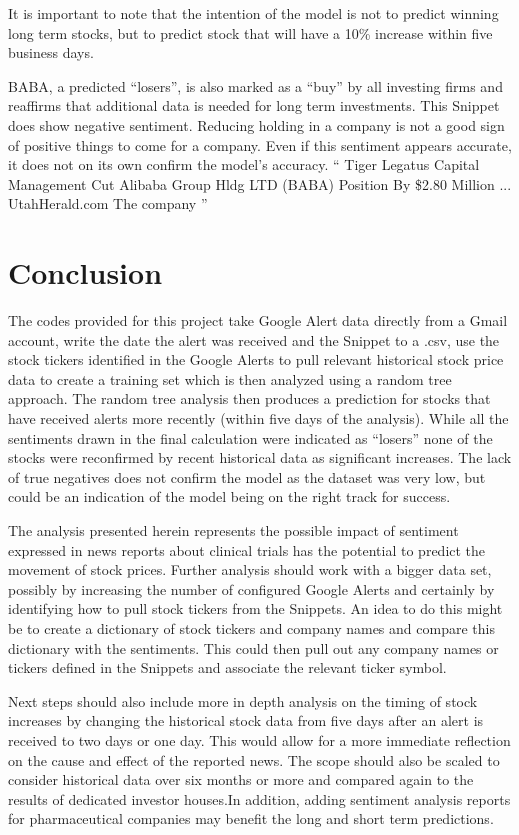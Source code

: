 \documentclass[sigconf]{acmart}
\begin{document}
 It is important to note that the intention of the model is not to predict winning long term stocks, but to predict stock that will have a 10\% increase within five business days.

BABA, a predicted ``losers'', is also marked as a ``buy'' by all investing firms and reaffirms that additional data is needed for long term investments. This Snippet does show negative sentiment. Reducing holding in a company is not a good sign of positive things to come for a company. Even if this sentiment appears accurate, it does not on its own confirm the model's accuracy.
``
Tiger Legatus Capital Management Cut Alibaba Group Hldg LTD (BABA) Position By \$2.80 Million ... UtahHerald.com The company
''



\section{Conclusion}
The codes provided for this project take Google Alert data directly from a Gmail account, write the date the alert was received and the Snippet to a .csv, use the stock tickers identified in the Google Alerts to pull relevant historical stock price data to create a training set which is then analyzed using a random tree approach. The random tree analysis then produces a prediction for stocks that have received alerts more recently (within five days of the analysis). While all the sentiments drawn in the final calculation were indicated as ``losers'' none of the stocks were reconfirmed by recent historical data as significant increases. The lack of true negatives does not confirm the model as the dataset was very low, but could be an indication of the model being on the right track for success.

The analysis presented herein represents the possible impact of sentiment expressed in news reports about clinical trials has the potential to predict the movement of stock prices. Further analysis should work with a bigger data set, possibly by increasing the number of configured Google Alerts and certainly by identifying how to pull stock tickers from the Snippets. An idea to do this might be to create a dictionary of stock tickers and company names and compare this dictionary with the sentiments. This could then pull out any company names or tickers defined in the Snippets and associate the relevant ticker symbol. 

Next steps should also include more in depth analysis on the timing of stock increases by changing the historical stock data from five days after an alert is received to two days or one day. This would allow for a more immediate reflection on the cause and effect of the reported news. The scope should also be scaled to consider historical data over six months or more and compared again to the results of dedicated investor houses.In addition, adding sentiment analysis reports for pharmaceutical companies may benefit the long and short term predictions.
\end{document}
